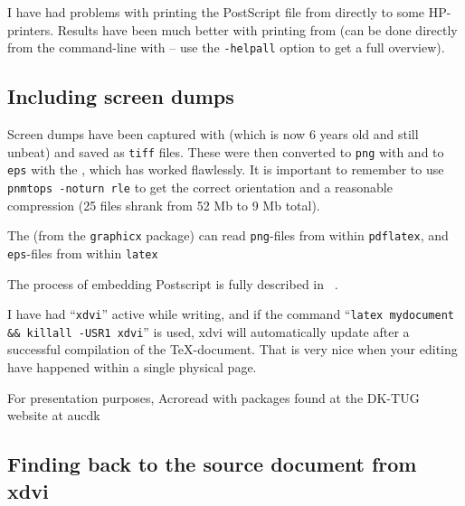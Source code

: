 I have had problems with printing the PostScript file from
 directly to some HP-printers.  Results have been
much better with printing from  (can be done directly from the command-line with
 -- use the
\texttt{-helpall} option to get a full overview).


\subsection{Including screen dumps}
\label{sec:report-writing-tools-latex-eps}

Screen dumps have been captured with
(which is now 6 years old and still unbeat) and saved as \texttt{tiff}
files.  These were then converted to \texttt{png} with
 and to \texttt{eps} with the
, which has worked flawlessly.  It is important to remember
to use \texttt{pnmtops -noturn rle} to get the correct orientation and
a reasonable compression (25 files shrank from 52 Mb to 9 Mb total).

The  (from the \texttt{graphicx} package)
can read \texttt{png}-files from within \texttt{pdflatex}, and
\texttt{eps}-files from within \texttt{latex}


The process of embedding Postscript is fully described in
~\cite{the-latex-graphics-companion}.


I have had ``\texttt{xdvi}'' active while writing, and if the command
``\texttt{latex mydocument \&\& killall -USR1 xdvi}'' is used, xdvi
will automatically update after a successful compilation of the
TeX-document.  That is very nice when your editing have happened
within a single physical page.

For presentation purposes, \textsf{Acroread with packages found at the
  DK-TUG website at aucdk}

\subsection{Finding back to the source document from xdvi}

